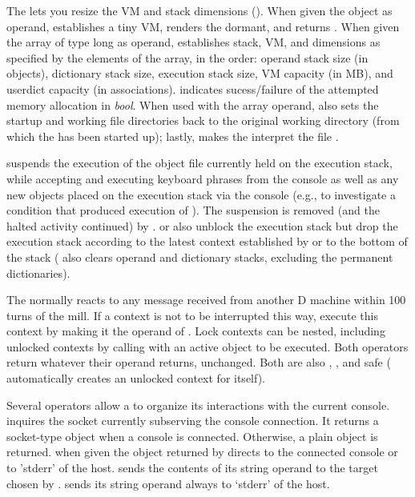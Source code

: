 The  lets you resize the VM and stack dimensions
(). When given the  object as operand,
 establishes a tiny VM, renders the 
dormant, and returns . When given the array of type long as
operand,  establishes stack, VM, and 
dimensions as specified by the elements of the array, in the order:
operand stack size (in objects), dictionary stack size, execution
stack size, VM capacity (in MB), and userdict capacity (in
associations).  indicates sucess/failure of the
attempted memory allocation in \emph{bool}. When used with the array
operand,  also sets the startup and working file
directories back to the original working directory (from which the
 has been started up); lastly,  makes the
 interpret the file .

 suspends the execution of the object file currently held
on the execution stack, while accepting and executing keyboard phrases
from the console as well as any new objects placed on the execution
stack via the console (e.g., to investigate a condition that produced
execution of ). The suspension is removed (and the halted
activity continued) by .  or 
also unblock the execution stack but drop the execution stack
according to the latest context established by  or to
the bottom of the stack ( also clears operand and
dictionary stacks, excluding the permanent dictionaries).

The  normally reacts to any message received from another
D machine within 100 turns of the mill. If a context is not to be
interrupted this way, execute this context by making it the operand of
. Lock contexts can be nested, including unlocked contexts by
calling  with an active object to be executed. Both
operators return whatever their operand returns, unchanged. Both are
also , , and  safe (
automatically creates an unlocked context for itself).

Several operators allow a  to organize its interactions
with the current console.  inquires the socket currently
subserving the console connection. It returns a socket-type
 object when a console is connected. Otherwise, a plain
 object is returned.  when given the
object returned by  directs  to the
connected console or to 'stderr' of the 
host.  sends the contents of its string operand to the
target chosen by .  sends its string
operand always to `stderr' of the host.

